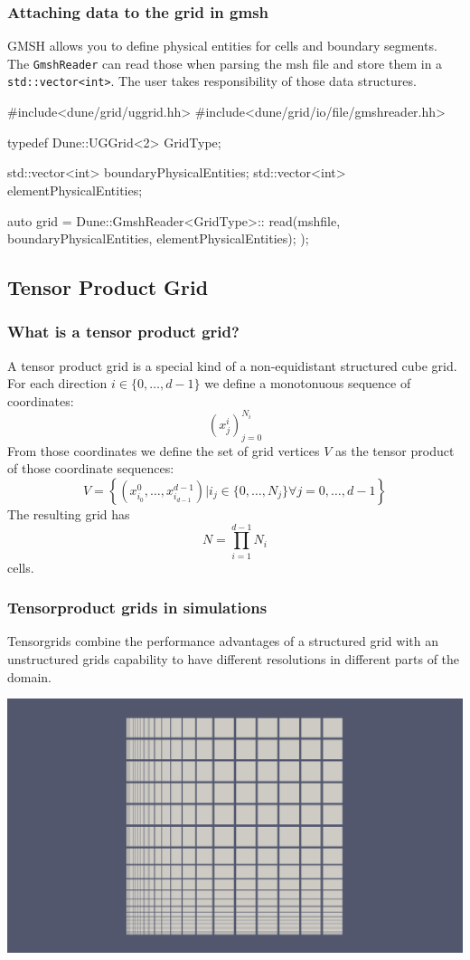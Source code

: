 \documentclass[aspectratio=169,11pt]{beamer}
\theoremstyle{definition}
\begin{document}
\begin{frame}[fragile]
\frametitle{Attaching data to the grid in gmsh}

GMSH allows you to define physical entities for cells and boundary segments.
The \lstinline!GmshReader! can read those when parsing the msh file and store
them in a \lstinline!std::vector<int>!. The user takes responsibility of those
data structures.
\begin{cppcode}
#include<dune/grid/uggrid.hh>
#include<dune/grid/io/file/gmshreader.hh>

typedef Dune::UGGrid<2> GridType;

std::vector<int> boundaryPhysicalEntities;
std::vector<int> elementPhysicalEntities;

auto grid = Dune::GmshReader<GridType>::
    read(mshfile, boundaryPhysicalEntities, elementPhysicalEntities);
);
\end{cppcode}
\end{frame}

\subsection{Tensor Product Grid}

\begin{frame}[fragile]
 \frametitle{What is a tensor product grid?}
 A tensor product grid is a special kind of a non-equidistant structured cube grid.
 For each direction $i\in\{ 0,\dots ,d-1\}$ we define a monotonuous sequence of
 coordinates:
 \begin{displaymath}
  \left(x^i_j\right)_{j=0}^{N_i}
 \end{displaymath}
 From those coordinates we define the set of grid vertices $V$ as the tensor product
 of those coordinate sequences:
 \begin{displaymath}
   V = \left\{(x^0_{i_0},\dots ,x^{d-1}_{i_{d-1}}) \big| i_j\in \{0,\dots ,N_j\} \forall j=0,\dots ,d-1\right\}
 \end{displaymath}
 The resulting grid has
 \begin{displaymath}
  N = \prod_{i=1}^{d-1}N_i
 \end{displaymath}
 cells.
\end{frame}


\begin{frame}
 \frametitle{Tensorproduct grids in simulations}

 Tensorgrids combine the performance advantages of a structured grid with
 an unstructured grids capability to have different resolutions in different
 parts of the domain.
 \begin{center}
  \includegraphics[width=.6\textwidth]{figures/io/tensorprod.png}
 \end{center}
\end{frame}
\end{document}
